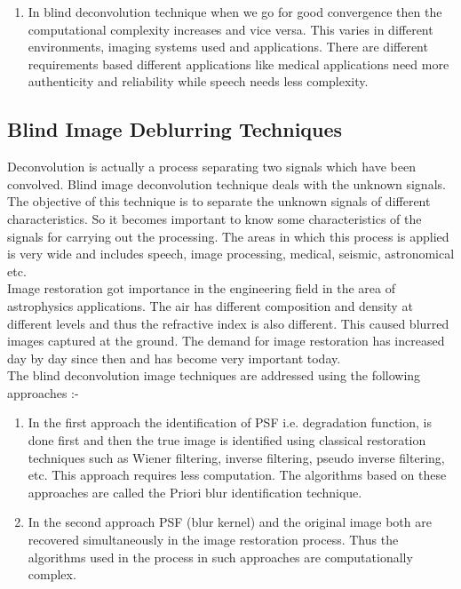 \documentclass{article}
\begin{document}
\begin{enumerate}
    \item In blind deconvolution technique when we go for good convergence then the computational complexity increases and vice versa. This varies in different environments, imaging systems used and applications. There are different requirements based different applications like medical applications need more authenticity and reliability while speech needs less complexity. 
\end{enumerate}

\subsection{Blind Image Deblurring Techniques}
Deconvolution is actually a process separating two signals which have been convolved. Blind image deconvolution technique deals with the unknown signals. The objective of this technique is to separate the unknown signals of different characteristics. So it becomes important to know some characteristics of the signals for carrying out the processing. The areas in which this process is applied is very wide and includes speech, image processing, medical, seismic, astronomical etc.  \\

Image restoration got importance in the engineering field in the area of astrophysics applications. The air has different composition and density at different levels and thus the refractive index is also different. This caused blurred images captured at the ground. The demand for image restoration has increased day by day since then and has become very important today.  \\

The blind deconvolution image techniques are addressed using the  following approaches \cite{gonzalez-woods} :- 
\begin{enumerate}
    
    \item In the first approach the identification of PSF i.e. degradation function, is done first and then the true image is identified using classical restoration techniques such as Wiener filtering, inverse filtering, pseudo inverse filtering, etc. This approach requires less computation. The algorithms based on these approaches are called the Priori blur identification technique.
    
    \item In the second approach PSF (blur kernel) and the original image both are recovered simultaneously in the image restoration process. Thus the algorithms used in the process in such approaches are computationally complex. 
\end{enumerate}
\end{document}

